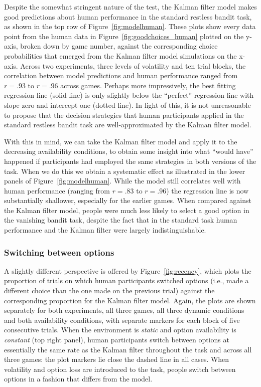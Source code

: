 \documentclass[a4paper,doc,natbib]{apa6}
\begin{document}
Despite the somewhat stringent nature of the test, the Kalman filter model makes good predictions about human performance in the standard restless bandit task, as shown in the top row of Figure~\ref{fig:modelhuman}. These plots show every data point from the human data in Figure~\ref{fig:goodchoices_human} plotted on the y-axis, broken down by game number, against the corresponding choice probabilities that emerged from the Kalman filter model simulations on the x-axis. Across two experiments, three levels of volatility and ten trial blocks, the correlation between model predictions and human performance ranged from $r=.93$ to $r=.96$ across games. Perhaps more impressively, the best fitting regression line (solid line) is only slightly below the ``perfect'' regression line with slope zero and intercept one (dotted line). In light of this, it is not unreasonable to propose that the decision strategies that human participants applied in the standard restless bandit task are well-approximated by the Kalman filter model.

With this in mind, we can take the Kalman filter model and apply it to the decreasing availability conditions, to obtain some insight into what ``would have'' happened if participants had employed the same strategies in both versions of the task. When we do this we obtain a systematic effect as illustrated in the lower panels of Figure~\ref{fig:modelhuman}. While the model still correlates well with human performance (ranging from $r=.83$ to $r=.96$) the regression line is now substantially shallower, especially for the earlier games. When compared against the Kalman filter model, people were much less likely to select a good option in the vanishing bandit task, despite the fact that in the standard task human performance and the Kalman filter were largely indistinguishable.

\subsubsection{Switching between options}

A slightly different perspective is offered by Figure~\ref{fig:recency}, which plots the proportion of trials on which human participants switched options (i.e., made a different choice than the one made on the previous trial) against the corresponding proportion for the Kalman filter model. Again, the plots are shown separately for both experiments, all three games, all three dynamic conditions and both availability conditions, with separate markers for each block of five consecutive trials. When the environment is {\it static} and option availability is {\it constant} (top right panel), human participants switch between options at essentially the same rate as the Kalman filter throughout the task and across all three games: the plot markers lie close the dashed line in all cases. When volatility and option loss are introduced to the task, people switch between options in a fashion that differs from the model.
\end{document}
